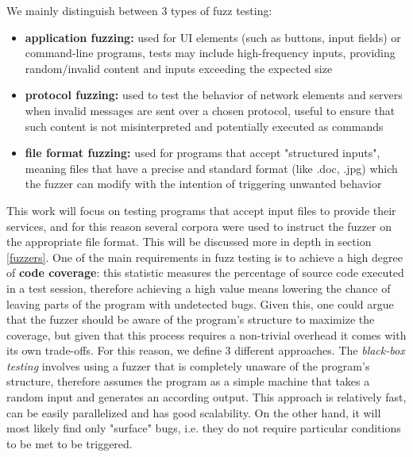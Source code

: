 \newpage
We mainly distinguish between 3 types of fuzz testing:
\begin{itemize}
    \item \textbf{application fuzzing:} used for UI elements (such as buttons, input fields) or command-line programs, tests may include high-frequency inputs, providing random/invalid content and inputs exceeding the expected size
    \item \textbf{protocol fuzzing:} used to test the behavior of network elements and servers when invalid messages are sent over a chosen protocol, useful to ensure that such content is not misinterpreted and potentially executed as commands
    \item  \textbf{file format fuzzing:} used for programs that accept "structured inputs", meaning files that have a precise and standard format (like .doc, .jpg) which the fuzzer can modify with the intention of triggering unwanted behavior
\end{itemize}
This work will focus on testing programs that accept input files to provide their services, and for this reason several corpora were used to instruct the fuzzer on the appropriate file format. This will be discussed more in depth in section \ref{fuzzers}.
\newline \newline \newline
One of the main requirements in fuzz testing is to achieve a high degree of \textbf{code coverage}: this statistic measures the percentage of source code executed in a test session, therefore achieving a high value means lowering the chance of leaving parts of the program with undetected bugs. Given this, one could argue that the fuzzer should be aware of the program's structure to maximize the coverage, but given that this process requires a non-trivial overhead it comes with its own trade-offs.
\newline \newline
For this reason, we define 3 different approaches.
\newline \newline
The \textit{black-box testing} involves using a fuzzer that is completely unaware of the program's structure, therefore assumes the program as a simple machine that takes a random input and generates an according output. This approach is relatively fast, can be easily parallelized and has good scalability. On the other hand, it will most likely find only "surface" bugs, i.e. they do not require particular conditions to be met to be triggered.     
